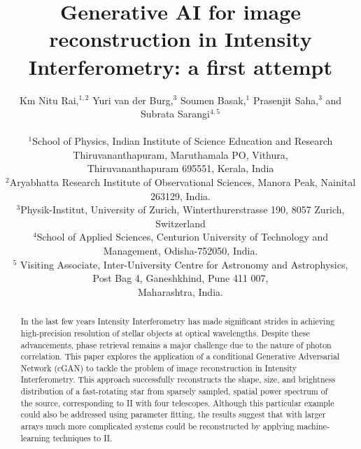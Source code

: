 \documentclass[fleqn,usenatbib,twocolumn]{mnras}
\title{Generative AI for image reconstruction in Intensity Interferometry: a first attempt}
\date{}
\author[Rai et al.]{Km Nitu Rai,$^{1,2}$ Yuri van der Burg,$^{3}$ Soumen Basak,$^{1}$ Prasenjit Saha,$^{3}$ and
	Subrata Sarangi$^{4,5}$ \\ \\
	$^{1}$School of Physics, Indian Institute of Science Education and Research Thiruvananthapuram, Maruthamala PO,
	Vithura,\\ Thiruvananthapuram 695551, Kerala, India \\
	$^{2}$Aryabhatta Research Institute of Observational Sciences, Manora Peak, Nainital 263129, India. \\
	$^{3}$Physik-Institut, University of Zurich, Winterthurerstrasse 190, 8057 Zurich, Switzerland \\
	$^{4}$School of Applied Sciences, Centurion University of Technology and Management, Odisha-752050, India. \\
    $^5$ Visiting Associate, Inter-University Centre for Astronomy and Astrophysics, Post Bag 4, Ganeshkhind, Pune 411 007,\\ Maharashtra, India.}
\begin{document}
\maketitle

\begin{abstract}
In the last few years Intensity Interferometry has made significant strides in achieving high-precision resolution of stellar objects at optical wavelengths. Despite these advancements, phase retrieval remains a major challenge due to the nature of photon correlation. This paper explores the application of a conditional Generative Adversarial Network (cGAN) to tackle the problem of image reconstruction in Intensity Interferometry. This approach successfully reconstructs the shape, size, and brightness distribution of a fast-rotating star from sparsely sampled, spatial power spectrum of the source, corresponding to II with four telescopes.  Although this particular example could also be addressed using parameter fitting, the results suggest that with larger arrays much more complicated systems could be reconstructed by applying machine-learning techniques to II.
\end{abstract}









\end{document}
